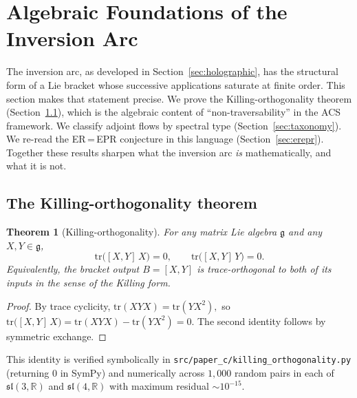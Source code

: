 \documentclass[11pt,a4paper]{article}
\theoremstyle{plain}
\newtheorem{theorem}{Theorem}[section]
\theoremstyle{definition}
\theoremstyle{remark}
\begin{document}
\section{Algebraic Foundations of the Inversion Arc}
\label{sec:algebraic}

The inversion arc, as developed in Section~\ref{sec:holographic}, has
the structural form of a Lie bracket whose successive applications
saturate at finite order.  This section makes that statement precise.
We prove the Killing-orthogonality theorem (Section~\ref{sec:killing}),
which is the algebraic content of ``non-traversability'' in the ACS
framework.  We classify adjoint flows by spectral type
(Section~\ref{sec:taxonomy}).  We re-read the ER\,=\,EPR conjecture
in this language (Section~\ref{sec:erepr}).  Together these
results sharpen what the inversion arc \emph{is} mathematically,
and what it is not.

\subsection{The Killing-orthogonality theorem}
\label{sec:killing}

\begin{theorem}[Killing-orthogonality]\label{thm:killing}
For any matrix Lie algebra $\mathfrak{g}$ and any $X, Y \in \mathfrak{g}$,
\begin{equation}\label{eq:killing-orth}
  \mathrm{tr}\bigl([X, Y]\,X\bigr) = 0,
  \qquad
  \mathrm{tr}\bigl([X, Y]\,Y\bigr) = 0.
\end{equation}
Equivalently, the bracket output $B = [X, Y]$ is trace-orthogonal to
both of its inputs in the sense of the Killing form.
\end{theorem}

\begin{proof}
By trace cyclicity,
\(
  \mathrm{tr}(XYX) = \mathrm{tr}(YX^2),
\)
so
\(
  \mathrm{tr}\bigl([X,Y]\,X\bigr) = \mathrm{tr}(XYX) - \mathrm{tr}(YX^2) = 0.
\)
The second identity follows by symmetric exchange.
\end{proof}

\noindent
This identity is verified symbolically in
\nolinkurl{src/paper_c/killing_orthogonality.py} (returning
$0$ in SymPy) and numerically across $1{,}000$ random pairs in each
of $\mathfrak{sl}(3,\mathbb{R})$ and $\mathfrak{sl}(4,\mathbb{R})$
with maximum residual $\sim 10^{-15}$.
\end{document}
